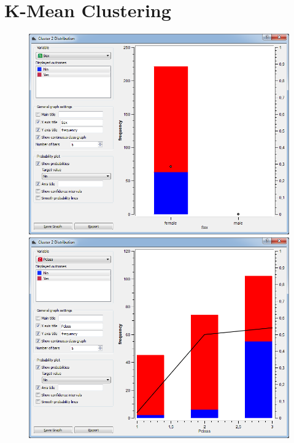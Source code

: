 \documentclass[a4paper,11pt]{article}
\begin{document}
\section{K-Mean Clustering}
\begin{figure}[h]
	\centering
	\begin{center}
		\includegraphics[scale=0.30]{ClusterDistribution/Cluster2/Sex}
		\includegraphics[scale=0.30]{ClusterDistribution/Cluster2/PClass}\\
		\vspace{1 mm}

\end{center}
\end{figure}
\end{document}

